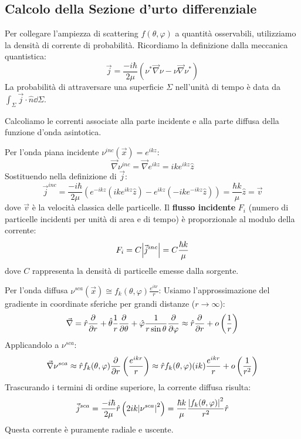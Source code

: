 \subsection{Calcolo della Sezione d'urto differenziale}

Per collegare l'ampiezza di scattering \( f(\theta, \varphi) \) a quantità osservabili, utilizziamo la densità di corrente di probabilità.
Ricordiamo la definizione dalla meccanica quantistica:
\begin{equation}
    \vec{j} = \frac{-i\hbar}{2\mu} \left( \nu^* \vec{\nabla} \nu - \nu \vec{\nabla} \nu^* \right)
\end{equation}
La probabilità di attraversare una superficie \( \Sigma \) nell'unità di tempo è data da \( \int_\Sigma \vec{j} \cdot \hat{n} \dd{\Sigma} \).

Calcoliamo le correnti associate alla parte incidente e alla parte diffusa della funzione d'onda asintotica.

Per l'onda piana incidente \( \nu^{inc}(\vec{x}) = e^{ikz} \):
\[
    \vec{\nabla} \nu^{inc} = \vec{\nabla} e^{ikz} = i k e^{ikz} \hat{z}
\]
Sostituendo nella definizione di \( \vec{j} \):
\begin{equation}
    \vec{j}^{inc} = \frac{-i\hbar}{2\mu} \left( e^{-ikz} (ik e^{ikz} \hat{z}) - e^{ikz} (-ik e^{-ikz} \hat{z}) \right) = \frac{\hbar k}{\mu} \hat{z} = \vec{v}
\end{equation}
dove \( \vec{v} \) è la velocità classica delle particelle.
Il \textbf{flusso incidente} \( F_i \) (numero di particelle incidenti per unità di area e di tempo) è proporzionale al modulo della corrente:
\[
    F_i = C \abs{\vec{j}^{inc}} = C \frac{\hbar k}{\mu}
\]
dove \( C \) rappresenta la densità di particelle emesse dalla sorgente.


Per l'onda diffusa \( \nu^{sca}(\vec{x}) \cong f_k(\theta, \varphi) \frac{e^{ikr}}{r} \):
Usiamo l'approssimazione del gradiente in coordinate sferiche per grandi distanze (\( r \to \infty \)):
\[
    \vec{\nabla} = \hat{r} \pdv{}{r} + \hat{\theta} \frac{1}{r} \pdv{}{\theta} + \hat{\varphi} \frac{1}{r \sin\theta} \pdv{}{\varphi} \approx \hat{r} \pdv{}{r} + o\left(\frac{1}{r}\right)
\]
Applicandolo a \( \nu^{sca} \):
\[
    \vec{\nabla} \nu^{sca} \approx \hat{r} f_k(\theta, \varphi) \pdv{}{r} \left( \frac{e^{ikr}}{r} \right) \approx \hat{r} f_k(\theta, \varphi) (ik) \frac{e^{ikr}}{r} + o\left(\frac{1}{r^2}\right)
\]
Trascurando i termini di ordine superiore, la corrente diffusa risulta:
\begin{equation}
    \vec{j}^{sca} = \frac{-i\hbar}{2\mu} \hat{r} \left( 2ik \abs{\nu^{sca}}^2 \right) = \frac{\hbar k}{\mu} \frac{\abs{f_k(\theta, \varphi)}^2}{r^2} \hat{r}
\end{equation}
Questa corrente è puramente radiale e uscente.


